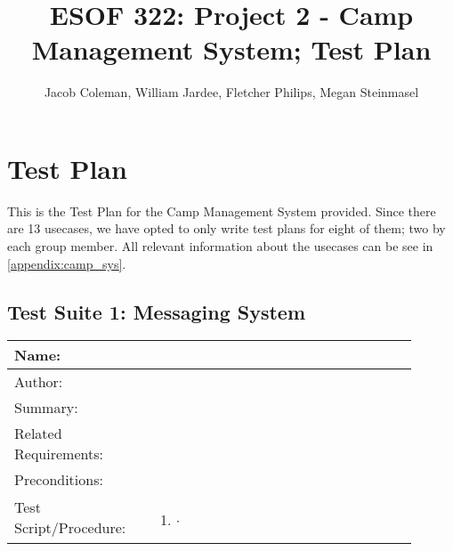 \documentclass[11pt]{article}
\begin{document}
\title{ESOF 322: Project 2 - Camp Management System; Test Plan}
\author{Jacob Coleman, William Jardee, Fletcher Philips, Megan Steinmasel}
\maketitle




\section*{Test Plan}

This is the Test Plan for the Camp Management System provided. Since there are 13 usecases, we have opted to only write test plans for eight of them; two by each group member. All relevant information about the usecases can be see in \cref{appendix:camp_sys}.



\subsection*{Test Suite 1: Messaging System}

\begin{table}[H]
\begin{center}
\begin{tabular}{p{0.30\linewidth}p{0.60\linewidth}}
	Name: & \\\hline
	Author: & \\\hline
	Summary: &  \\\hline
	Related Requirements:& \\\hline
	Preconditions:& \\\hline
	Test Script/Procedure: & \begin{enumerate}
	\item $\cdot$
	\end{enumerate}\\\hline
\end{tabular}
\label{des:}	
\end{center}
\end{table}
\end{document}

